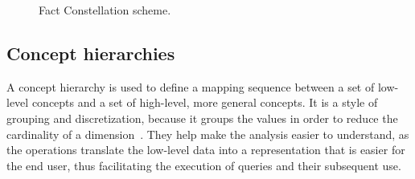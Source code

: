\begin{figure}[!htb]
  \caption{Fact Constellation scheme.}\label{fig:factconstschema}
  \vspace{6mm}
  \begin{center}
  \end{center}
  \vspace{2mm}
  \legenda{}
\end{figure}

\subsection{Concept hierarchies}\label{ch:fun:cube:concept}

A concept hierarchy is used to define a mapping sequence between a set of low-level concepts and a set of high-level, more general concepts.
It is a style of grouping and discretization, because it groups the values in order to reduce the cardinality of a dimension~\cite{hanDataMiningConcepts2011}.
They help make the analysis easier to understand, as the operations translate the low-level data into a representation that is easier for the end user, thus facilitating the execution of queries and their subsequent use.

